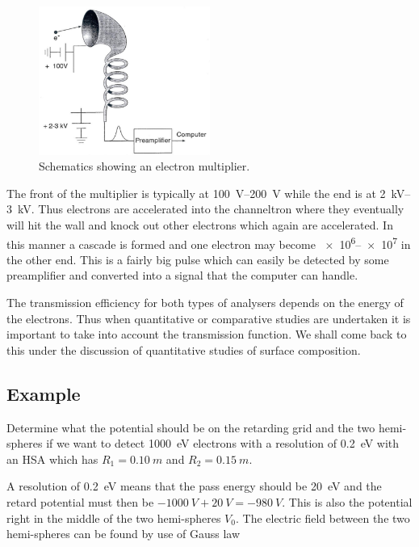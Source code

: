 \begin{figure}[htbp]
\centering
\includegraphics[width=0.5\textwidth]{figures/03_03}
\caption{Schematics showing an electron multiplier.}
\label{fig:electron_multiplier}
\end{figure}

The front of the multiplier is typically at  \SIrange{100}{200}{V} while the end is at \SIrange{2}{3}{kV}. Thus electrons are accelerated into the channeltron where they eventually will hit the wall and knock out other electrons which again are accelerated. In this manner a cascade is formed and one electron may become \numrange[range-phrase = --]{e6}{e7} in the other end. This is a fairly big pulse which can easily be detected by some preamplifier and converted into a signal that the computer can handle.

The transmission efficiency for both types of analysers depends on the energy of the electrons. Thus when quantitative or comparative studies are undertaken it is important to take into account the transmission function. We shall come back to this under the discussion of quantitative studies of surface composition.

\subsection{Example}
Determine what the potential should be on the retarding grid and the two hemi-spheres if we want to detect \SI{1000}{\electronvolt} electrons with a resolution of \SI{0.2}{\electronvolt} with an HSA which has $R_{1}=\SI{0.10}{m}$ and $R_{2}=\SI{0.15}{m}$.

A resolution of \SI{0.2}{\electronvolt} means that the pass energy should be \SI{20}{\electronvolt} and the retard potential must then be $\SI{-1000}{V}+\SI{20}{V}=\SI{-980}{V}$. This is also the potential right in the middle of the two hemi-spheres $V_{0}$. The electric field between the two hemi-spheres can be found by use of Gauss law

